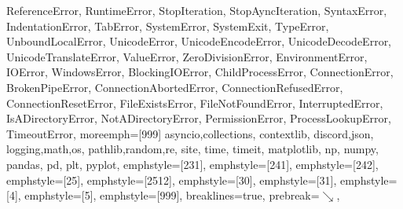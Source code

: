 {{  ReferenceError, RuntimeError, StopIteration, StopAyncIteration, SyntaxError,
  IndentationError, TabError, SystemError, SystemExit, TypeError,
  UnboundLocalError, UnicodeError, UnicodeEncodeError, UnicodeDecodeError,
  UnicodeTranslateError, ValueError, ZeroDivisionError, EnvironmentError,
  IOError, WindowsError,
  BlockingIOError, ChildProcessError, ConnectionError, BrokenPipeError,
  ConnectionAbortedError, ConnectionRefusedError, ConnectionResetError,
  FileExistsError, FileNotFoundError, InterruptedError, IsADirectoryError,
  NotADirectoryError, PermissionError, ProcessLookupError, TimeoutError},
  moreemph=[999]{%
  asyncio,collections, contextlib,
  discord,json,
  logging,math,os,
  pathlib,random,re, site,
  time, timeit,
  matplotlib, np, numpy, pandas, pd, plt, pyplot},
  emphstyle=[231]{\color{magenta}}, %
  emphstyle=[241]{\color{magenta}}, %
  emphstyle=[242]{\color{magenta}}, %
  emphstyle=[25]{\color{brightcyan}}, %
  emphstyle=[2512]{\color{brightblue}}, %
  emphstyle=[30]{\color{brightcyan}},
  emphstyle=[31]{\color{brightblue}}, %
  emphstyle=[4]{\color{brightmagenta}},
  emphstyle=[5]{\bfseries\color{red}},
  emphstyle=[999]{\color{brightyellow}}, %
  breaklines=true,
  prebreak=\mbox{{\color{brightblack}\scriptsize$\searrow$}},
}

\def\cconv#1{  %
  \extractcolorspecs{#1}{\model}{\mycolor}
  \definecolor{w}{HTML}{FFFFFF} \definecolor{b}{HTML}{000000}
  \def\cconvhtml{\convertcolorspec{\model}{\mycolor}{HTML}\tmp\tmp}
  \def\cconvrgbb{\convertcolorspec{\model}{\mycolor}{RGB}\tmp\tmp}
  \def\cconvcmyk{\convertcolorspec{\model}{\mycolor}{cmyk}\tmp\tmp}
  \def\chonkyclr{\Large\sf\cconvhtml}
  \vbox{\offinterlineskip\footnotesize\tt\hsize=18em
    \halign{
      \hfil##: &
      \vtop{
        \hsize=18em\parindent0em\hangindent0em \strut##\strut
      }&
      \hfil##&\hfil##&\hfil##&\hfil##\cr
      \omit\MakeUppercase{\sf Colour info for #1}\hidewidth\cr
      \noalign{\medskip}
      \sf HTML&\#\cconvhtml\cr
      \sf RGB&[\cconvrgbb]\cr
      \sf CMYK&[\cconvcmyk]\cr
    }
    \halign{
    \hfil\strut##\strut&\strut##\strut\hfil\cr
    \fcolorbox{w}{w}{\color{#1}\chonkyclr}&
    \fcolorbox{w}{b}{\color{#1}\chonkyclr}\cr
    \fcolorbox{w}{#1}{\color{w}\chonkyclr}&
    \fcolorbox{w}{#1}{\color{b}\chonkyclr}\cr\noalign{\medskip}
    }
  }
}

